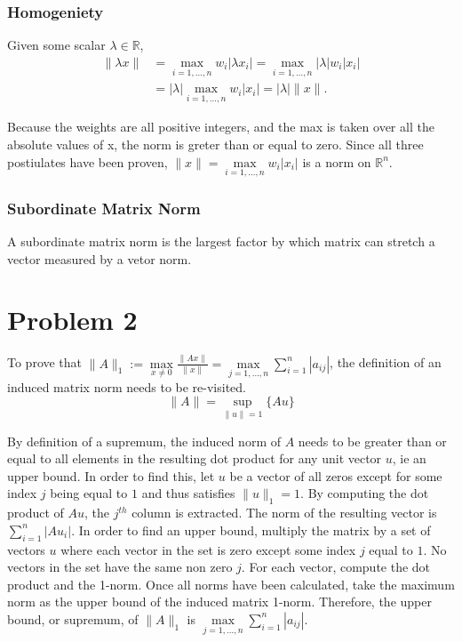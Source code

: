 \documentclass{report}
\begin{document}
\subsubsection*{Homogeniety}

Given some scalar $\lambda\in\mathbb{R}$,
\[
\begin{aligned}
\|\lambda x\|
&= \max_{i=1,\dots,n} w_i|\lambda x_i|
= \max_{i=1,\dots,n} |\lambda|w_i|x_i| \\
&= |\lambda|\max_{i=1,\dots,n} w_i|x_i|
= |\lambda|\|x\|.
\end{aligned}
\]

\noindent Because the weights are all positive integers, and the max is taken over all the absolute values of x, the norm is greter than or equal to zero.
Since all three postiulates have been proven, $\|x\| = \max\limits_{i=1,\dots,n}w_i|x_i|$ is a norm on $\mathbb{R}^n$.

\subsubsection*{Subordinate Matrix Norm}
A subordinate matrix norm is the largest factor by which matrix can stretch a vector measured by a vetor norm.

\section*{Problem 2}

To prove that $\|A\|_1:=\max\limits_{x\neq 0} \frac{\|Ax\|}{\|x\|} = \max\limits_{j=1,\dots,n} \sum\limits_{i=1}^n |a_{ij}|$,
the definition of an induced matrix norm needs to be re-visited. 
$$\|A\| = \sup\limits_{\|u\|=1}\{Au\}$$ 

\noindent By definition of a supremum, the induced norm of $A$ needs to be greater than or equal to all elements in the resulting dot product for any unit vector $u$, ie an upper bound.
In order to find this, let $u$ be a vector of all zeros except for some index $j$ being equal to $1$ and thus satisfies $\|u\|_1=1$. By computing the dot product of $Au$, the $j^{th}$ column is 
extracted. The norm of the resulting vector is $\sum\limits_{i=1}^n |Au_i|$. In order to find an upper bound, multiply the matrix by a set of vectors $u$ where each vector in the set
is zero except some index $j$ equal to $1$. No vectors in the set have the same non zero $j$. For each vector, compute the dot product
and the 1-norm. Once all norms have been calculated, take the maximum norm as the upper bound of the induced matrix 1-norm.
Therefore, the upper bound, or supremum, of $\|A\|_1$ is $\max\limits_{j=1,\dots,n} \sum\limits_{i=1}^n |a_{ij}|$.
\end{document}
